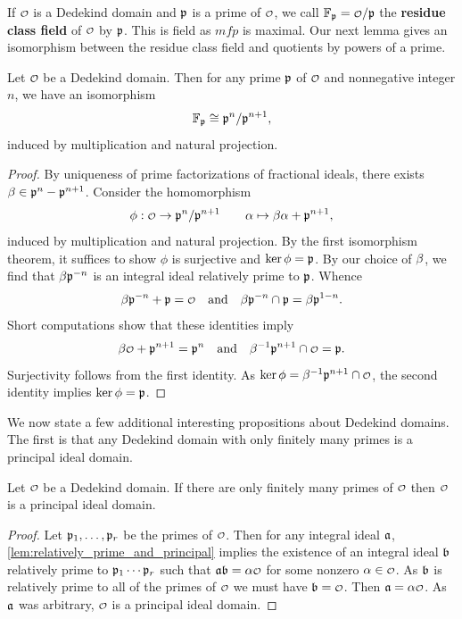     If \(\smc{O}\) is a Dedekind domain and \(\mathfrak{p}\) is a prime of \(\smc{O}\), we call \(\F_{\mf{p}} = \smc{O}/\mf{p}\) the \textbf{residue class field} of \(\smc{O}\) by \(\mathfrak{p}\). This is field as \(mf{p}\) is maximal. Our next lemma gives an isomorphism between the residue class field and quotients by powers of a prime.

    \begin{lemma}\label{lem:isomorphism_of_quotient_by_prime_integral_ideals}
      Let \(\smc{O}\) be a Dedekind domain. Then for any prime \(\mathfrak{p}\) of \(\smc{O}\) and nonnegative integer \(n\), we have an isomorphism
      \[
        \mathbb{F}_{\mathfrak{p}} \cong \mathfrak{p}^{n}/\mathfrak{p}^{n+1},
      \]
      induced by multiplication and natural projection.
    \end{lemma}
    \begin{proof}
      By uniqueness of prime factorizations of fractional ideals, there exists \(\beta \in \mathfrak{p}^{n}-\mathfrak{p}^{n+1}\). Consider the homomorphism
      \[
        \phi:\smc{O} \to \mf{p}^{n}/\mf{p}^{n+1} \qquad \a \mapsto \b\a+\mf{p}^{n+1},
      \]
      induced by multiplication and natural projection. By the first isomorphism theorem, it suffices to show \(\phi\) is surjective and \(\ker\phi = \mathfrak{p}\). By our choice of \(\beta\), we find that \(\beta\mathfrak{p}^{-n}\) is an integral ideal relatively prime to \(\mathfrak{p}\). Whence
      \[
        \b\mf{p}^{-n}+\mf{p} = \smc{O} \quad \text{and} \quad \b\mf{p}^{-n} \cap \mf{p} = \b\mf{p}^{1-n}.
      \]
      Short computations show that these identities imply
      \[
        \b\smc{O}+\mf{p}^{n+1} = \mf{p}^{n} \quad \text{and} \quad \b^{-1}\mf{p}^{n+1} \cap \smc{O} = \mf{p}.
      \]
      Surjectivity follows from the first identity. As \(\ker\phi = \b^{-1}\mf{p}^{n+1} \cap \smc{O}\), the second identity implies \(\ker\phi = \mathfrak{p}\).
    \end{proof}

    We now state a few additional interesting propositions about Dedekind domains. The first is that any Dedekind domain with only finitely many primes is a principal ideal domain.

    \begin{proposition}\label{prop:Dedekind_with_finite_primes_is_PID}
      Let \(\smc{O}\) be a Dedekind domain. If there are only finitely many primes of \(\smc{O}\) then \(\smc{O}\) is a principal ideal domain.
    \end{proposition}
    \begin{proof}
      Let \(\mathfrak{p}_{1},\ldots,\mathfrak{p}_{r}\) be the primes of \(\smc{O}\). Then for any integral ideal \(\mathfrak{a}\), \cref{lem:relatively_prime_and_principal} implies the existence of an integral ideal \(\mathfrak{b}\) relatively prime to \(\mathfrak{p}_{1} \cdots \mathfrak{p}_{r}\) such that \(\mf{a}\mf{b} = \a\smc{O}\) for some nonzero \(\a \in \smc{O}\). As \(\mathfrak{b}\) is relatively prime to all of the primes of \(\smc{O}\) we must have \(\mf{b} = \smc{O}\). Then \(\mf{a} = \a\smc{O}\). As \(\mathfrak{a}\) was arbitrary, \(\smc{O}\) is a principal ideal domain.
    \end{proof}
    
